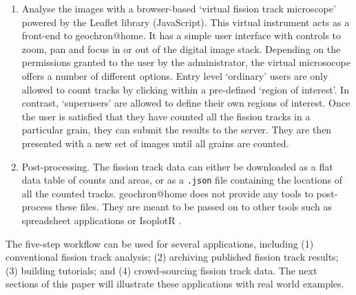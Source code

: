 \documentclass[gchron, manuscript]{copernicus}
\begin{document}
\begin{enumerate}
\item Analyse the images with a browser-based `virtual fission track
  microscope' powered by the Leaflet library (JavaScript). This
  virtual instrument acts as a front-end to geochron@home. It has a
  simple user interface with controls to zoom, pan and focus in or out
  of the digital image stack. Depending on the permissions granted to
  the user by the administrator, the virtual microsocope offers a
  number of different options.  Entry level `ordinary' users are only
  allowed to count tracks by clicking within a pre-defined `region of
  interest'. In contrast, `superusers' are allowed to define their own
  regions of interest. Once the user is satisfied that they have
  counted all the fission tracks in a particular grain, they can
  submit the results to the server. They are then presented with a new
  set of images until all grains are counted.

\item Post-processing. The fission track data can either be downloaded
  as a flat data table of counts and areas, or as a \texttt{.json}
  file containing the locations of all the counted
  tracks. geochron@home does not provide any tools to post-process
  these files. They are meant to be passed on to other tools such as
  spreadsheet applications or IsoplotR \citep{vermeesch2018c}.
  
\end{enumerate}
  
The five-step workflow can be used for several applications, including
(1) conventional fission track analysis; (2) archiving published
fission track results; (3) building tutorials; and (4) crowd-sourcing
fission track data. The next sections of this paper will illustrate
these applications with real world examples.\medskip
\end{document}
